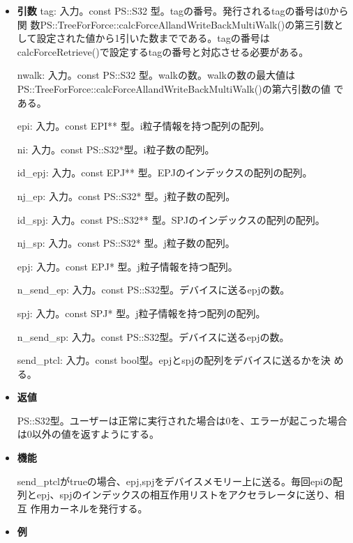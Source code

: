 \begin{itemize}

\item {\bf 引数}
  tag: 入力。const PS::S32 型。tagの番号。発行されるtagの番号は0から関
  数PS::TreeForForce::calcForceAllandWriteBackMultiWalk()の第三引数と
  して設定された値から1引いた数までである。tagの番号は
  calcForceRetrieve()で設定するtagの番号と対応させる必要がある。

  nwalk: 入力。const PS::S32 型。walkの数。walkの数の最大値は
  PS::TreeForForce::calcForceAllandWriteBackMultiWalk()の第六引数の値
  である。

  epi: 入力。const EPI** 型。i粒子情報を持つ配列の配列。

  ni: 入力。const PS::S32*型。i粒子数の配列。

  id\_epj: 入力。const EPJ** 型。EPJのインデックスの配列の配列。
  
  nj\_ep: 入力。const PS::S32* 型。j粒子数の配列。

  id\_spj: 入力。const PS::S32** 型。SPJのインデックスの配列の配列。
  
  nj\_sp: 入力。const PS::S32* 型。j粒子数の配列。

  epj: 入力。const EPJ* 型。j粒子情報を持つ配列。

  n\_send\_ep: 入力。const PS::S32型。デバイスに送るepjの数。

  spj: 入力。const SPJ* 型。j粒子情報を持つ配列の配列。

  n\_send\_sp: 入力。const PS::S32型。デバイスに送るepjの数。

  send\_ptcl: 入力。const bool型。epjとspjの配列をデバイスに送るかを決
  める。

\item {\bf 返値}

  PS::S32型。ユーザーは正常に実行された場合は0を、エラーが起こった場合
  は0以外の値を返すようにする。
  
\item {\bf 機能}

send\_ptclがtrueの場合、epj,spjをデバイスメモリー上に送る。毎回epiの配
列とepj、spjのインデックスの相互作用リストをアクセラレータに送り、相互
作用カーネルを発行する。

\item {\bf 例}


\end{itemize}
